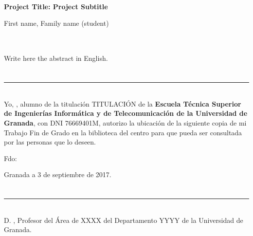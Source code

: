 \begin{center}
{\large\bfseries Project Title: Project Subtitle}\\
\end{center}
\begin{center}
First name, Family name (student)\\
\end{center}

\\

\vspace{0.7cm}
\\

Write here the abstract in English.

\chapter*{}
\thispagestyle{empty}

\noindent\rule[-1ex]{\textwidth}{2pt}\\[4.5ex]

Yo, \textbf{\myName}, alumno de la titulación TITULACIÓN de la \textbf{Escuela Técnica Superior
de Ingenierías Informática y de Telecomunicación de la Universidad de Granada}, con DNI 76669401M, autorizo la
ubicación de la siguiente copia de mi Trabajo Fin de Grado en la biblioteca del centro para que pueda ser
consultada por las personas que lo deseen.

\vspace{6cm}

\noindent Fdo: \myName

\vspace{2cm}

\begin{flushright}
Granada a 3 de septiembre de 2017.
\end{flushright}


\chapter*{}
\thispagestyle{empty}

\noindent\rule[-1ex]{\textwidth}{2pt}\\[4.5ex]

D. \textbf{\myProf}, Profesor del Área de XXXX del Departamento YYYY de la Universidad de Granada.

\vspace{0.5cm}

